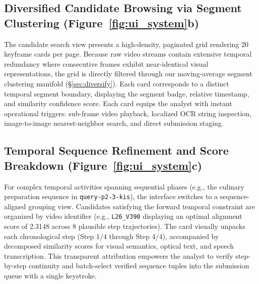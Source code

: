 \subsection{Diversified Candidate Browsing via Segment Clustering (Figure~\ref{fig:ui_system}b)}
The candidate search view presents a high-density, paginated grid rendering 20 keyframe cards per page. Because raw video streams contain extensive temporal redundancy where consecutive frames exhibit near-identical visual representations, the grid is directly filtered through our moving-average segment clustering manifold (\S\ref{sec:diversify}). Each card corresponds to a distinct temporal segment boundary, displaying the segment badge, relative timestamp, and similarity confidence score. Each card equips the analyst with instant operational triggers: sub-frame video playback, localized OCR string inspection, image-to-image nearest-neighbor search, and direct submission staging.

\subsection{Temporal Sequence Refinement and Score Breakdown (Figure~\ref{fig:ui_system}c)}
For complex temporal activities spanning sequential phases (e.g., the culinary preparation sequence in \texttt{query-p2-3-kis}), the interface switches to a sequence-aligned grouping view. Candidates satisfying the forward temporal constraint are organized by video identifier (e.g., \texttt{L26\_V390} displaying an optimal alignment score of 2.3148 across 8 plausible step trajectories). The card visually unpacks each chronological step (Step 1/4 through Step 4/4), accompanied by decomposed similarity scores for visual semantics, optical text, and speech transcription. This transparent attribution empowers the analyst to verify step-by-step continuity and batch-select verified sequence tuples into the submission queue with a single keystroke.

